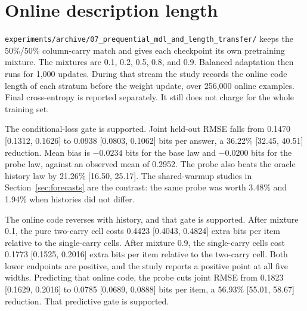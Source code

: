\section{Online description length}
\label{sec:mdl}

\texttt{experiments/archive/07\_prequential\_mdl\_and\_length\_transfer/} keeps the 50\%/50\% column-carry match and gives each checkpoint its own pretraining mixture.
The mixtures are 0.1, 0.2, 0.5, 0.8, and 0.9.
Balanced adaptation then runs for 1{,}000 updates.
During that stream the study records the online code length of each stratum before the weight update, over 256{,}000 online examples.
Final cross-entropy is reported separately.
It still does not charge for the whole training set.

The conditional-loss gate is supported.
Joint held-out RMSE falls from 0.1470 [0.1312, 0.1626] to 0.0938 [0.0803, 0.1062] bits per answer, a 36.22\% [32.45, 40.51] reduction.
Mean bias is $-0.0234$ bits for the base law and $-0.0200$ bits for the probe law, against an observed mean of 0.2952.
The probe also beats the oracle history law by 21.26\% [16.50, 25.17].
The shared-warmup studies in Section~\ref{sec:forecasts} are the contrast: the same probe was worth 3.48\% and 1.94\% when histories did not differ.

The online code reverses with history, and that gate is supported.
After mixture 0.1, the pure two-carry cell costs 0.4423 [0.4043, 0.4824] extra bits per item relative to the single-carry cells.
After mixture 0.9, the single-carry cells cost 0.1773 [0.1525, 0.2016] extra bits per item relative to the two-carry cell.
Both lower endpoints are positive, and the study reports a positive point at all five widths.
Predicting that online code, the probe cuts joint RMSE from 0.1823 [0.1629, 0.2016] to 0.0785 [0.0689, 0.0888] bits per item, a 56.93\% [55.01, 58.67] reduction.
That predictive gate is supported.

